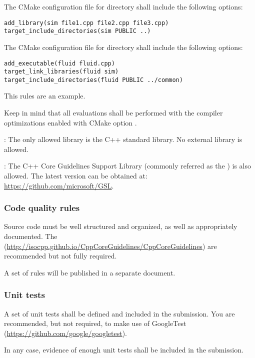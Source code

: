 The CMake configuration file for directory  shall include the
following options:

\begin{lstlisting}[title={Library sim CmakeLists.txt},frame=single]
add_library(sim file1.cpp file2.cpp file3.cpp)
target_include_directories(sim PUBLIC ..)
\end{lstlisting}

The CMake configuration file for directory  shall include the
following options:

\begin{lstlisting}[title={Program fluid CmakeLists.txt},frame=single]
add_executable(fluid fluid.cpp)
target_link_libraries(fluid sim)
target_include_directories(fluid PUBLIC ../common)
\end{lstlisting}

This rules are an example. 

Keep in mind that all evaluations shall be performed with the compiler optimizations
enabled with CMake option
.

: 
The only allowed library is the C++ standard library.
No external library is allowed.

: The C++ Core Guidelines Support Library (commonly referred as
the ) is also allowed. The latest version can be obtained at:
\url{https://github.com/microsoft/GSL}.

\subsubsection{Code quality rules}

Source code must be well structured and organized, 
as well as appropriately documented.
The 
(\url{http://isocpp.github.io/CppCoreGuidelines/CppCoreGuidelines})
are recommended but not fully required.

A set of rules will be published in a separate document.

\subsubsection{Unit tests}

A set of unit tests shall be defined and included in the submission.
You are recommended, but not required, to make use of GoogleTest
(\url{https://github.com/google/googletest}).

In any case, evidence of enough unit tests shall be included in the
submission.

